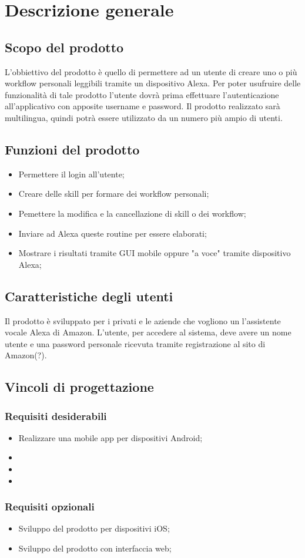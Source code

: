 \chapter{Descrizione generale}

\section{Scopo del prodotto}
L'obbiettivo del prodotto è quello di permettere ad un utente di creare uno o più workflow personali leggibili tramite un dispositivo Alexa.
Per poter usufruire delle funzionalità di tale prodotto l'utente dovrà prima effettuare l'autenticazione all'applicativo con apposite username e password.
Il prodotto realizzato sarà multilingua, quindi potrà essere utilizzato da un numero più ampio di utenti.


\section{Funzioni del prodotto}
\begin{itemize}
	\item Permettere il login all'utente;
	\item Creare delle skill per formare dei workflow personali;
	\item Pemettere la modifica e la cancellazione di skill o dei workflow;
	\item Inviare ad Alexa queste routine per essere elaborati;
	\item Mostrare i risultati tramite GUI mobile oppure "a voce" tramite dispositivo Alexa;
\end{itemize}

\section{Caratteristiche degli utenti}
Il prodotto è sviluppato per i privati e le aziende che vogliono un l'assistente vocale Alexa di Amazon.
L'utente, per accedere al sistema, deve avere un nome utente e una password personale ricevuta tramite registrazione al sito di Amazon(?).

\section{Vincoli di progettazione}
\subsection{Requisiti desiderabili}
\begin{itemize}
	\item Realizzare una mobile app per dispositivi Android;
	\item
	\item
	\item
\end{itemize}
\subsection{Requisiti opzionali}
\begin{itemize}
	\item Sviluppo del prodotto per dispositivi iOS;
	\item Sviluppo del prodotto con interfaccia web;
\end{itemize}